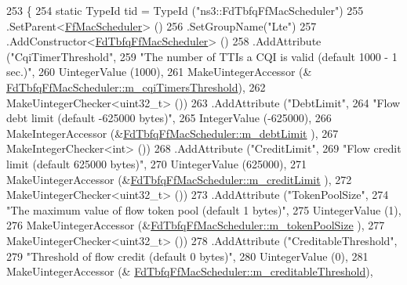 \begin{DoxyCode}
253 \{
254   \textcolor{keyword}{static} TypeId tid = TypeId (\textcolor{stringliteral}{"ns3::FdTbfqFfMacScheduler"})
255     .SetParent<\hyperlink{classns3_1_1FfMacScheduler_aa4c8ce28dbba2c19ff3328533c444045}{FfMacScheduler}> ()
256     .SetGroupName(\textcolor{stringliteral}{"Lte"})
257     .AddConstructor<\hyperlink{classns3_1_1FdTbfqFfMacScheduler_ac477fe3176012b8f47af380d23ae8cb2}{FdTbfqFfMacScheduler}> ()
258     .AddAttribute (\textcolor{stringliteral}{"CqiTimerThreshold"},
259                    \textcolor{stringliteral}{"The number of TTIs a CQI is valid (default 1000 - 1 sec.)"},
260                    UintegerValue (1000),
261                    MakeUintegerAccessor (&
      \hyperlink{classns3_1_1FdTbfqFfMacScheduler_a5699ce6b376d8919bd386101b5c55e4a}{FdTbfqFfMacScheduler::m\_cqiTimersThreshold}),
262                    MakeUintegerChecker<uint32\_t> ())
263     .AddAttribute (\textcolor{stringliteral}{"DebtLimit"},
264                    \textcolor{stringliteral}{"Flow debt limit (default -625000 bytes)"},
265                    IntegerValue (-625000),
266                    MakeIntegerAccessor (&\hyperlink{classns3_1_1FdTbfqFfMacScheduler_aa73b1800df86289d9a1fc49886c9a175}{FdTbfqFfMacScheduler::m\_debtLimit}
      ),
267                    MakeIntegerChecker<int> ())
268     .AddAttribute (\textcolor{stringliteral}{"CreditLimit"},
269                    \textcolor{stringliteral}{"Flow credit limit (default 625000 bytes)"},
270                    UintegerValue (625000),
271                    MakeUintegerAccessor (&\hyperlink{classns3_1_1FdTbfqFfMacScheduler_aa390b2d541c6190fd44f6457fe006a38}{FdTbfqFfMacScheduler::m\_creditLimit}
      ),
272                    MakeUintegerChecker<uint32\_t> ())
273     .AddAttribute (\textcolor{stringliteral}{"TokenPoolSize"},
274                    \textcolor{stringliteral}{"The maximum value of flow token pool (default 1 bytes)"},
275                    UintegerValue (1),
276                    MakeUintegerAccessor (&\hyperlink{classns3_1_1FdTbfqFfMacScheduler_a0f729f9c65abdbcd28f36269f501fe14}{FdTbfqFfMacScheduler::m\_tokenPoolSize}
      ),
277                    MakeUintegerChecker<uint32\_t> ())
278     .AddAttribute (\textcolor{stringliteral}{"CreditableThreshold"},
279                    \textcolor{stringliteral}{"Threshold of flow credit (default 0 bytes)"},
280                    UintegerValue (0),
281                    MakeUintegerAccessor (&
      \hyperlink{classns3_1_1FdTbfqFfMacScheduler_a581771a634fa44e3e817131accd9db1f}{FdTbfqFfMacScheduler::m\_creditableThreshold}),

\end{DoxyCode}
